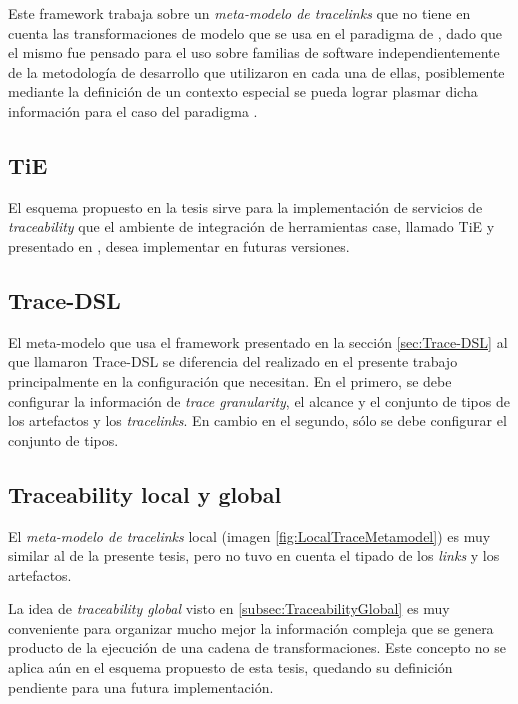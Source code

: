 \documentclass[a4paper,12pt,oneside,spanish]{book}
\begin{document}
Este framework trabaja sobre un \textit{meta-modelo de tracelinks} que no tiene en cuenta las transformaciones de modelo que se usa en el paradigma de , dado que el mismo fue pensado para el uso sobre familias de software independientemente de la metodología de desarrollo que utilizaron en cada una de ellas, posiblemente mediante la definición de un contexto especial se pueda lograr plasmar dicha información para el caso del paradigma .


\subsection*{TiE}

El esquema propuesto en la tesis sirve para la implementación de servicios de \textit{traceability} que el ambiente de integración de herramientas \gls{case}, llamado \textsf{TiE} y presentado en \cite{KlarRoseSchurr}, desea implementar en futuras versiones.


\subsection*{Trace-DSL}

El meta-modelo que usa el framework presentado en la sección \ref{sec:Trace-DSL} al que llamaron \textsf{Trace-DSL} se diferencia del realizado en el presente trabajo principalmente en la configuración que necesitan. En el primero, se debe configurar la información de \textit{trace granularity}, el alcance y el conjunto de tipos de los artefactos y los \textit{tracelinks}. En cambio en el segundo, sólo se debe configurar el conjunto de tipos.


\subsection*{Traceability local y global}

El \textit{meta-modelo de tracelinks} local (imagen \ref{fig:LocalTraceMetamodel}) es muy similar al de la presente tesis, pero no tuvo en cuenta el tipado de los \textit{links} y los artefactos. 

La idea de \textit{traceability global} visto en \ref{subsec:TraceabilityGlobal} es muy conveniente para organizar mucho mejor la información compleja que se genera producto de la ejecución de una cadena de transformaciones. Este concepto no se aplica aún en el esquema propuesto de esta tesis, quedando su definición pendiente para una futura implementación.
\end{document}
